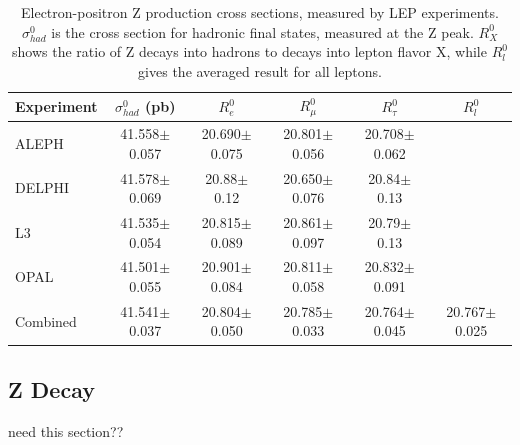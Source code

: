 \begin{table}[htbp]
  \begin{center}
    \caption[Electron-positron Z production cross sections, 
      measured by LEP experiments]
	    {Electron-positron Z production cross sections, 
	      measured by LEP experiments. 
	      $\sigma_{had}^0$ is the cross section for hadronic 
	      final states, measured at the Z peak. 
	      $R_X^0$ shows the ratio of Z decays into hadrons 
	      to decays into lepton flavor X, 
	      while $R_l^0$ gives the averaged result for all leptons.  
	    }
    \label{TableLep}
    \begin{tabular}[]{ | l | c | c | c | c | c |}
      \hline
      Experiment & $\sigma_{had}^0 $ (pb) & $R_e^0$ & $R_{\mu}^0$ & $R_{\tau}^0$ & $R_l^0$ \\ \hline \hline
      ALEPH & 41.558$\pm$0.057 & 20.690$\pm$0.075 & 20.801$\pm$0.056 & 20.708$\pm$0.062 &\\ \hline
      DELPHI & 41.578$\pm$0.069 & 20.88$\pm$0.12 & 20.650$\pm$0.076 & 20.84$\pm$0.13 &\\ \hline
      L3 & 41.535$\pm$0.054 & 20.815$\pm$0.089 & 20.861$\pm$0.097 & 20.79$\pm$0.13 &\\ \hline
      OPAL & 41.501$\pm$0.055 & 20.901$\pm$0.084 & 20.811$\pm$0.058 & 20.832$\pm$0.091 &\\ \hline
      Combined & 41.541$\pm$0.037 & 20.804$\pm$0.050 & 20.785$\pm$0.033 & 20.764$\pm$0.045 & 20.767$\pm$0.025\\ \hline
    \end{tabular}
  \end{center}
\end{table}



\subsection{Z Decay}
\label{theory:Zdec}
need this section??





